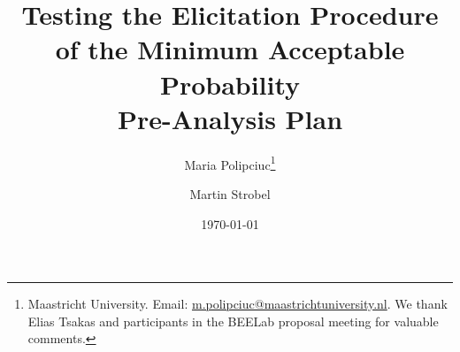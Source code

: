 
\title{Testing the Elicitation Procedure \\ of the Minimum Acceptable Probability \\
\Large Pre-Analysis Plan}
\author{Maria Polipciuc\thanks{Maastricht University. Email: \url{m.polipciuc@maastrichtuniversity.nl}. We thank Elias Tsakas and participants in the BEELab proposal meeting for valuable comments.} \and Martin Strobel\footnotemark[1]}
\date{\today	\vspace{1cm}}
\titlepage



\begin{titlepage}
\clearpage
\maketitle
\thispagestyle{empty}
\end{titlepage}
\tableofcontents





